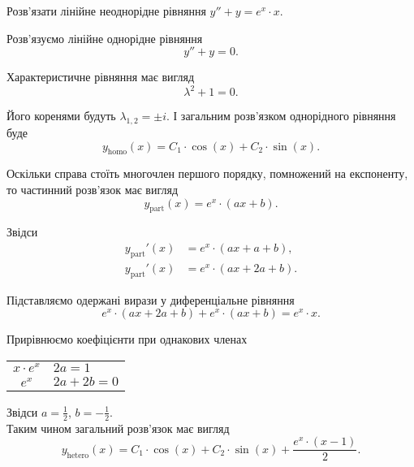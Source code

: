 \begin{example}
	Розв’язати лінійне неоднорідне рівняння $y'' + y = e^x \cdot x$.
\end{example}
\begin{solution}
	Розв’язуємо лінійне однорідне рівняння
	\begin{equation*}
		y'' + y = 0.
	\end{equation*}
	
	Характеристичне рівняння має вигляд
	\begin{equation*}
		\lambda^2 + 1 = 0.
	\end{equation*}

	Його коренями будуть $\lambda_{1, 2} = \pm i$. І загальним роз\-в'яз\-ком однорідного рівняння буде
	\begin{equation*}
		y_{\text{homo}}(x) = C_1 \cdot \cos (x) + C_2 \cdot \sin (x).
	\end{equation*}

	Оскільки справа стоїть многочлен першого порядку, помножений на експоненту, то частинний роз\-в'яз\-ок має вигляд
	\begin{equation*}
		y_{\text{part}}(x) = e^x \cdot (a x + b).
	\end{equation*}

	Звідси
	\begin{align*}
		y_{\text{part}}'(x) &= e^x \cdot (a x + a + b), \\
		y_{\text{part}}'(x) &= e^x \cdot (a x + 2 a + b).
	\end{align*}

	Підставляємо одержані вирази у диференціальне рівняння
	\begin{equation*}
		e^x \cdot (a x + 2 a + b) + e^x \cdot (a x + b) = e^x \cdot x.
	\end{equation*}

	Прирівнюємо коефіцієнти при однакових членах
	\begin{table}[H]
		\centering
		\begin{tabular}{c|l}
			$x \cdot e^x$ & $2 a = 1$ \\
			$e^x$ & $2 a + 2 b = 0$
		\end{tabular}
	\end{table}

	Звідси $a = \frac12$, $b = - \frac12$. \\

	Таким чином загальний розв’язок має вигляд
	\begin{equation*}
		y_{\text{hetero}}(x) = C_1 \cdot \cos (x) + C_2 \cdot \sin (x) + \frac{e^x \cdot (x - 1)}{2}.
	\end{equation*}
\end{solution}

